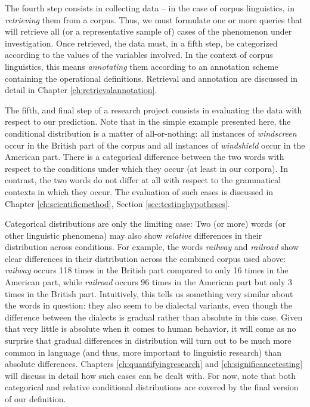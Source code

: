 The fourth step consists in collecting data -- in the case of corpus linguistics, in \emph{retrieving} them from a corpus. Thus, we must formulate one or more queries that will retrieve all (or a representative sample of) cases of the phenomenon under investigation. Once retrieved, the data must, in a fifth step, be categorized according to the values of the variables involved. In the context of corpus linguistics, this means \emph{annotating} them according to an annotation scheme containing the operational definitions. Retrieval and annotation are discussed in detail in Chapter \ref{ch:retrievalannotation}.

The fifth, and final step of a research project consists in evaluating the data with respect to our prediction. Note that in the simple example presented here, the conditional distribution is a matter of all-or-nothing: all instances of \textit{windscreen} occur in the British part of the corpus and all instances of \textit{windshield} occur in the American part. There is a categorical difference between the two words with respect to the conditions under which they occur (at least in our corpora). In contrast, the two words do not differ at all with respect to the grammatical contexts in which they occur. The evaluation of such cases is discussed in Chapter \ref{ch:scientificmethod}, Section \ref{sec:testinghypotheses}.

Categorical distributions are only the limiting case: Two (or more) words (or other linguistic phenomena) may also show \emph{relative} differences in their distribution across conditions. For example, the words \textit{railway} and \textit{railroad} show clear differences in their distribution across the combined corpus used above: \textit{railway} occurs 118 times in the British part compared to only 16 times in the American part, while \textit{railroad} occurs 96 times in the American part but only 3 times in the British part. Intuitively, this tells us something very similar about the words in question: they also seem to be dialectal variants, even though the difference between the dialects is gradual rather than absolute in this case. Given that very little is absolute when it comes to human behavior, it will come as no surprise that gradual differences in distribution will turn out to be much more common in language (and thus, more important to linguistic research) than absolute differences. Chapters \ref{ch:quantifyingresearch} and \ref{ch:significancetesting} will discuss in detail how such cases can be dealt with. For now, note that both categorical and relative conditional distributions are covered by the final version of our definition.


